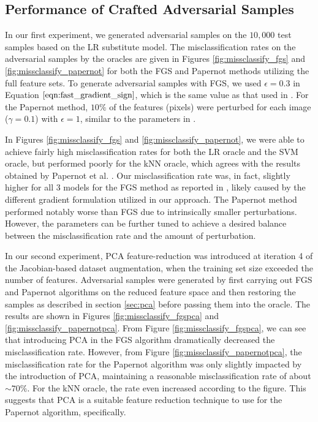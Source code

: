 \subsection{Performance of Crafted Adversarial Samples}
In our first experiment, we generated adversarial samples on the $10,000$ test samples based on the LR substitute model. The misclassification rates on the adversarial samples by the oracles are given in Figures \ref{fig:missclassify_fgs}  and \ref{fig:missclassify_papernot} for both the FGS and Papernot methods utilizing the full feature sets. To generate adversarial samples with FGS, we used $\epsilon = 0.3$ in Equation $\ref{eqn:fast_gradient_sign}$, which is the same value as that used in \cite{papernot3}. For the Papernot method, $10\%$ of the features (pixels) were perturbed for each image ($\gamma = 0.1$) with $\epsilon = 1$, similar to the parameters in \cite{papernot1}.

\indent In Figures \ref{fig:missclassify_fgs}  and \ref{fig:missclassify_papernot}, we were able to achieve fairly high misclassification rates for both the LR oracle and the SVM oracle, but performed poorly for the kNN oracle, which agrees with the results obtained by Papernot et al. . Our misclassification rate was, in fact, slightly higher for all 3 models for the FGS method as reported in \cite{papernot3}, likely caused by the different gradient formulation utilized in our approach. The Papernot method performed notably worse than FGS due to intrinsically smaller perturbations. However, the parameters can be further tuned to achieve a desired balance between the misclassification rate and the amount of perturbation.

\indent In our second experiment, PCA feature-reduction was introduced at iteration 4 of the Jacobian-based dataset augmentation, when the training set size exceeded the number of features. Adversarial samples were generated by first carrying out FGS and Papernot algorithms on the reduced feature space and then restoring the samples as described in section \ref{sec:pca} before passing them into the oracle. The results are shown in Figures \ref{fig:missclassify_fgspca} and \ref{fig:missclassify_papernotpca}. From Figure \ref{fig:missclassify_fgspca}, we can see that introducing PCA in the FGS algorithm dramatically decreased the misclassification rate. However, from Figure \ref{fig:missclassify_papernotpca}, the misclassification rate for the Papernot algorithm was only slightly impacted by the introduction of PCA, maintaining a reasonable misclassification rate of about $\sim 70\%$. For the kNN oracle, the rate even increased according to the figure. This suggests that PCA is a suitable feature reduction technique to use for the Papernot algorithm, specifically.


